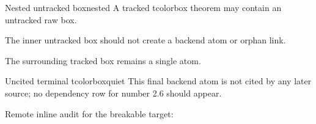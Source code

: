 \documentclass{article}
\begin{document}
\begin{tcbfree}{Nested untracked box}{nested}
A tracked tcolorbox theorem may contain an untracked raw box.
\begin{innerplain}
The inner untracked box should not create a backend atom or orphan link.
\end{innerplain}
The surrounding tracked box remains a single atom.
\end{tcbfree}

\begin{tcbfree}{Uncited terminal tcolorbox}{quiet}
This final backend atom is not cited by any later source; no dependency row for number 2.6 should appear.
\end{tcbfree}


\begingroup
{}
\noindent Remote inline audit for the breakable target: 
\par
\endgroup
{}

\codepappendix
\END
\end{document}
